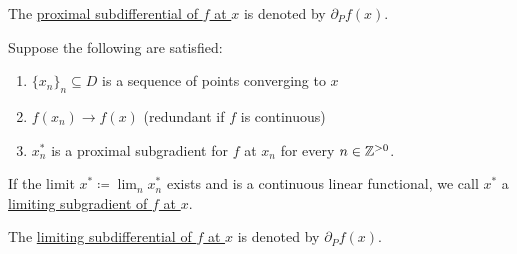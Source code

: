 \begin{definition}
\begin{defenum}
    The \uline{proximal subdifferential of $f$ at $x$} is denoted by $\partial_P f(x)$.

    \item\label{def:subdifferentials/limiting}\cite[definition 11.10]{Clarke2013} Suppose the following are satisfied:
    \begin{enumerate}
      \item $\{ x_n \}_n \subseteq D$ is a sequence of points converging to $x$
      \item $f(x_n) \to f(x)$ (redundant if $f$ is continuous)
      \item $x_n^*$ is a proximal subgradient for $f$ at $x_n$ for every $n \in \mathbb{Z}^{>0}$.
    \end{enumerate}

    If the limit $x^* \coloneqq \lim_n x_n^*$ exists and is a continuous linear functional, we call $x^*$ a \uline{limiting subgradient of $f$ at $x$}.

    The \uline{limiting subdifferential of $f$ at $x$} is denoted by $\partial_P f(x)$.
  \end{defenum}
\end{definition}
